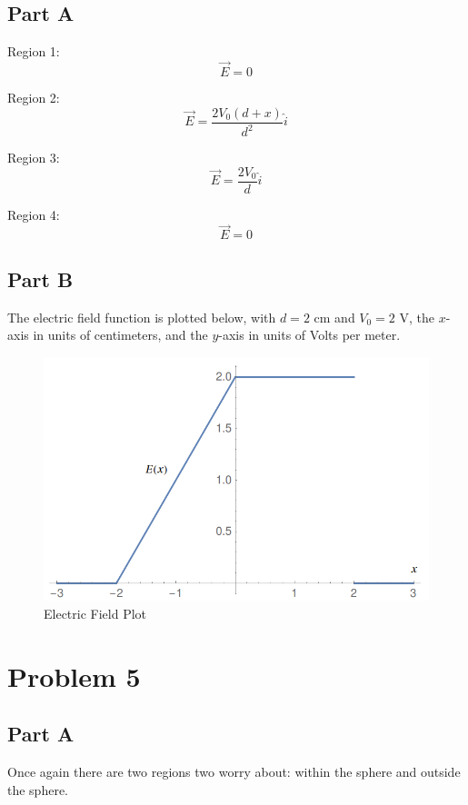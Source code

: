 \documentclass{article}
\begin{document}
\subsection*{Part A}

Region 1:
$$ \vec{E} = 0 $$

Region 2:
$$ \vec{E} = \frac{ 2 V_{0} (d + x) }{ d^{2} } \hat{i} $$

Region 3:
$$ \vec{E} = \frac{ 2 V_{0} }{ d } \hat{i} $$

Region 4:
$$ \vec{E} = 0 $$

\subsection*{Part B}

The electric field function is plotted below, with $d = 2$ cm and $V_{0} = 2$ V,
the $x$-axis in units of centimeters, and the $y$-axis in units of Volts per
meter.

\begin{figure}[H]
  \centering
  \includegraphics[scale=0.40]{"EFieldPlot"}
  \caption{Electric Field Plot}
\end{figure}

\section*{Problem 5}

\subsection*{Part A}

Once again there are two regions two worry about: within the sphere and outside
the sphere.
\end{document}
